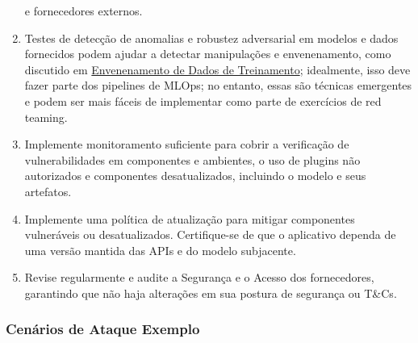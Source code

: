 \documentclass[
]{article}
\begin{document}
\begin{enumerate}
  e fornecedores externos.
\item
  Testes de detecção de anomalias e robustez adversarial em modelos e
  dados fornecidos podem ajudar a detectar manipulações e envenenamento,
  como discutido em
  \href{https://github.com/OWASP/www-project-top-10-for-large-language-model-applications/blob/main/1_0_vulns/Training_Data_Poisoning.md}{Envenenamento
  de Dados de Treinamento}; idealmente, isso deve fazer parte dos
  pipelines de MLOps; no entanto, essas são técnicas emergentes e podem
  ser mais fáceis de implementar como parte de exercícios de red
  teaming.
\item
  Implemente monitoramento suficiente para cobrir a verificação de
  vulnerabilidades em componentes e ambientes, o uso de plugins não
  autorizados e componentes desatualizados, incluindo o modelo e seus
  artefatos.
\item
  Implemente uma política de atualização para mitigar componentes
  vulneráveis ou desatualizados. Certifique-se de que o aplicativo
  dependa de uma versão mantida das APIs e do modelo subjacente.
\item
  Revise regularmente e audite a Segurança e o Acesso dos fornecedores,
  garantindo que não haja alterações em sua postura de segurança ou
  T\&Cs.
\end{enumerate}

\subsubsection{Cenários de Ataque
Exemplo}\label{cenuxe1rios-de-ataque-exemplo}
\end{document}
